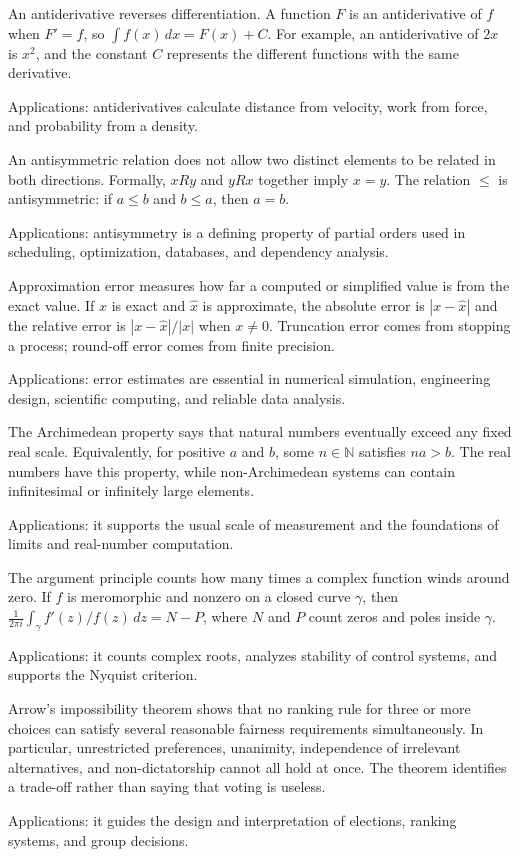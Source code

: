 An antiderivative reverses differentiation. A function $F$ is an antiderivative of $f$ when $F'=f$, so $\int f(x)\,dx=F(x)+C$. For example, an antiderivative of $2x$ is $x^2$, and the constant $C$ represents the different functions with the same derivative. \par\noindent Applications: antiderivatives calculate distance from velocity, work from force, and probability from a density.

An antisymmetric relation does not allow two distinct elements to be related in both directions. Formally, $xRy$ and $yRx$ together imply $x=y$. The relation $\le$ is antisymmetric: if $a\le b$ and $b\le a$, then $a=b$. \par\noindent Applications: antisymmetry is a defining property of partial orders used in scheduling, optimization, databases, and dependency analysis.

Approximation error measures how far a computed or simplified value is from the exact value. If $x$ is exact and $\hat x$ is approximate, the absolute error is $|x-\hat x|$ and the relative error is $|x-\hat x|/|x|$ when $x\ne0$. Truncation error comes from stopping a process; round-off error comes from finite precision. \par\noindent Applications: error estimates are essential in numerical simulation, engineering design, scientific computing, and reliable data analysis.

The Archimedean property says that natural numbers eventually exceed any fixed real scale. Equivalently, for positive $a$ and $b$, some $n\in\mathbb N$ satisfies $na>b$. The real numbers have this property, while non-Archimedean systems can contain infinitesimal or infinitely large elements. \par\noindent Applications: it supports the usual scale of measurement and the foundations of limits and real-number computation.

The argument principle counts how many times a complex function winds around zero. If $f$ is meromorphic and nonzero on a closed curve $\gamma$, then $\frac{1}{2\pi i}\int_\gamma f'(z)/f(z)\,dz=N-P$, where $N$ and $P$ count zeros and poles inside $\gamma$. \par\noindent Applications: it counts complex roots, analyzes stability of control systems, and supports the Nyquist criterion.

Arrow's impossibility theorem shows that no ranking rule for three or more choices can satisfy several reasonable fairness requirements simultaneously. In particular, unrestricted preferences, unanimity, independence of irrelevant alternatives, and non-dictatorship cannot all hold at once. The theorem identifies a trade-off rather than saying that voting is useless. \par\noindent Applications: it guides the design and interpretation of elections, ranking systems, and group decisions.

